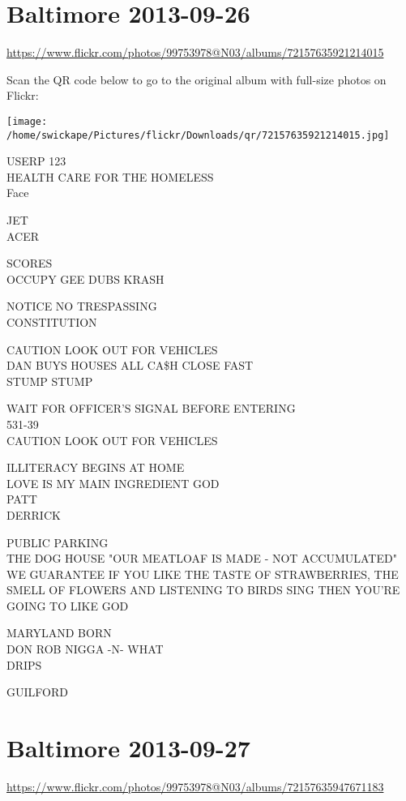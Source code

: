 \documentclass[10pt,letterpaper]{article}
\begin{document}
\section*{Baltimore 2013-09-26}

\url{https://www.flickr.com/photos/99753978@N03/albums/72157635921214015}

Scan the QR code below to go to the original album with full-size photos on Flickr:

\texttt{[image: /home/swickape/Pictures/flickr/Downloads/qr/72157635921214015.jpg]}


USERP 123\\
HEALTH CARE FOR THE HOMELESS\\
Face

JET\\
ACER

SCORES\\
OCCUPY GEE DUBS KRASH

NOTICE NO TRESPASSING\\
CONSTITUTION

CAUTION LOOK OUT FOR VEHICLES\\
DAN BUYS HOUSES ALL CA\$H CLOSE FAST\\
STUMP STUMP

WAIT FOR OFFICER'S SIGNAL BEFORE ENTERING\\
531{-}39\\
CAUTION LOOK OUT FOR VEHICLES

ILLITERACY BEGINS AT HOME\\
LOVE IS MY MAIN INGREDIENT GOD\\
PATT\\
DERRICK

PUBLIC PARKING\\
THE DOG HOUSE "OUR MEATLOAF IS MADE {-} NOT ACCUMULATED"\\
WE GUARANTEE IF YOU LIKE THE TASTE OF STRAWBERRIES, THE SMELL OF FLOWERS AND LISTENING TO BIRDS SING THEN YOU'RE GOING TO LIKE GOD

MARYLAND BORN\\
DON ROB NIGGA {-}N{-} WHAT\\
DRIPS

GUILFORD


\section*{Baltimore 2013-09-27}

\url{https://www.flickr.com/photos/99753978@N03/albums/72157635947671183}
\end{document}
